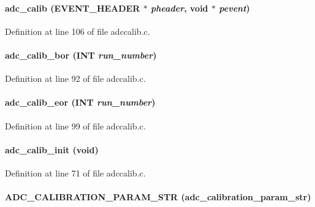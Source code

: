 \paragraph[{adc\_\-calib}]{ adc\_\-calib ({\bf EVENT\_\-HEADER} $\ast$ {\em pheader}, \/  void $\ast$ {\em pevent})}\hfill\label{adccalib_8c_a21e1931a7c367947aeec0daa9548b6e7}


Definition at line 106 of file adccalib.c.
\paragraph[{adc\_\-calib\_\-bor}]{ adc\_\-calib\_\-bor ({\bf INT} {\em run\_\-number})}\hfill\label{adccalib_8c_ad0c45258e6a5ff1cf274ca70e77cc2b1}


Definition at line 92 of file adccalib.c.
\paragraph[{adc\_\-calib\_\-eor}]{ adc\_\-calib\_\-eor ({\bf INT} {\em run\_\-number})}\hfill\label{adccalib_8c_afe5e825c262fc181d5213c0ffee2ce47}


Definition at line 99 of file adccalib.c.
\paragraph[{adc\_\-calib\_\-init}]{ adc\_\-calib\_\-init (void)}\hfill\label{adccalib_8c_adf3cd7b1ae0f16be900debc52adf49da}


Definition at line 71 of file adccalib.c.
\paragraph[{ADC\_\-CALIBRATION\_\-PARAM\_\-STR}]{\setlength{\rightskip}{0pt plus 5cm}ADC\_\-CALIBRATION\_\-PARAM\_\-STR (adc\_\-calibration\_\-param\_\-str)}\hfill\label{adccalib_8c_a96ff1f85b6b52f72dee24b3e3da0de5b}


